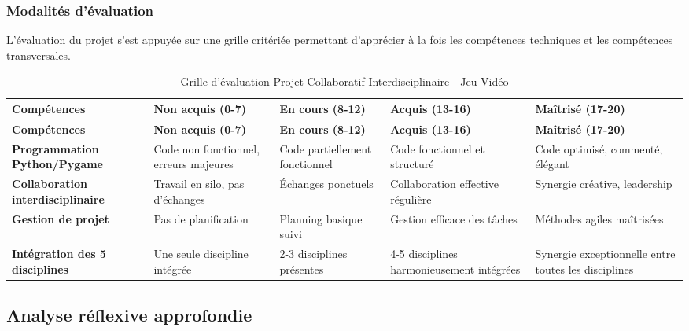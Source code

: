 \subsubsection{Modalités d'évaluation}
L'évaluation du projet s'est appuyée sur une grille critériée permettant d'apprécier à la fois les compétences techniques et les compétences transversales.

\begin{longtable}{|p{3.5cm}|p{2.5cm}|p{2.5cm}|p{2.5cm}|p{2.5cm}|}
\caption{Grille d'évaluation Projet Collaboratif Interdisciplinaire - Jeu Vidéo} \\
\hline
\textbf{Compétences} & \textbf{Non acquis (0-7)} & \textbf{En cours (8-12)} & \textbf{Acquis (13-16)} & \textbf{Maîtrisé (17-20)} \\
\hline
\endfirsthead
\hline
\textbf{Compétences} & \textbf{Non acquis (0-7)} & \textbf{En cours (8-12)} & \textbf{Acquis (13-16)} & \textbf{Maîtrisé (17-20)} \\
\hline
\endhead

\textbf{Programmation Python/Pygame} &
Code non fonctionnel, erreurs majeures &
Code partiellement fonctionnel &
Code fonctionnel et structuré &
Code optimisé, commenté, élégant \\
\hline

\textbf{Collaboration interdisciplinaire} &
Travail en silo, pas d'échanges &
Échanges ponctuels &
Collaboration effective régulière &
Synergie créative, leadership \\
\hline

\textbf{Gestion de projet} &
Pas de planification &
Planning basique suivi &
Gestion efficace des tâches &
Méthodes agiles maîtrisées \\
\hline

\textbf{Intégration des 5 disciplines} &
Une seule discipline intégrée &
2-3 disciplines présentes &
4-5 disciplines harmonieusement intégrées &
Synergie exceptionnelle entre toutes les disciplines \\
\hline

\end{longtable}

\subsection{Analyse réflexive approfondie}


